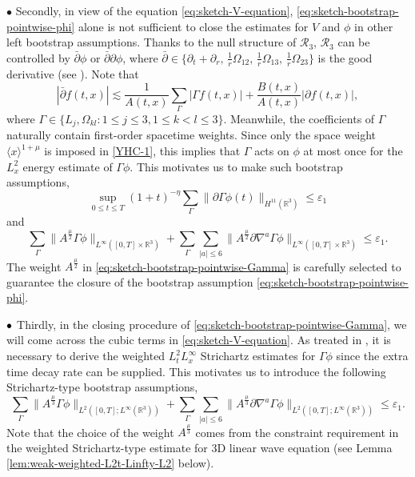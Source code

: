 \documentclass[11pt,twoside]{article}
\theoremstyle{plain}
\theoremstyle{definition}
\theoremstyle{assumption}
\numberwithin{equation}{section}
\begin{document}
 $\bullet$ Secondly, in view of the equation \eqref{eq:sketch-V-equation}, \eqref{eq:sketch-bootstrap-pointwise-phi} alone is not sufficient
 	to close the estimates for $V$ and $\phi$ in other left bootstrap
 	assumptions. Thanks to the null structure
 	of $\mathcal R_3$, $\mathcal R_3$ can be controlled by
 	$\bar\partial\phi$ or $\bar\partial\partial\phi$, where $\bar\partial\in\big\{\partial_t+\partial_r,\,
		\frac1r\Omega_{12},\,\frac1r\Omega_{13},\,	\frac1r\Omega_{23}\big\}$ is the good
 	derivative (see \cite{Alinhac:book}).
Note that
	\begin{equation}
		\label{eq:sketch-good-derivative-Gamma}
		|\bar\partial f(t,x)|
		\lesssim
		\frac1{A(t,x)}
		\sum_{\Gamma}|\Gamma f(t,x)|
		+
		\frac{B(t,x)}{A(t,x)}
		|\partial f(t,x)|,
	\end{equation}
	where $\Gamma\in\{L_j,\Omega_{kl}: 1\le j\le3, 1\le k<l\le3\}$.
	Meanwhile, the coefficients of \(\Gamma\) naturally contain first-order spacetime weights.
	Since only the space weight $\langle x\rangle^{1+\mu}$ is imposed in \eqref{YHC-1},
this implies that $\Gamma$ acts on $\phi$ at most once for the $L_x^2$ energy estimate of $\Gamma\phi$.
This motivates us  to make such bootstrap assumptions,
	\begin{equation}
		\label{eq:sketch-bootstrap-energy-Gamma}
		\sup_{0\le t\le T}
		(1+t)^{-\eta}
		\sum_{\Gamma}
		\|\partial\Gamma\phi(t)\|_{H^{11}(\mathbb R^3)}
		\le
		\varepsilon_1
	\end{equation}
	and
	\begin{equation}
		\label{eq:sketch-bootstrap-pointwise-Gamma}
		\sum_{\Gamma}
		\big\|
		A^{\frac{\mu}{2}}
		\Gamma\phi
		\big\|_{L^\infty([0,T]\times\mathbb R^3)}+
		\sum_{\Gamma}
		\sum_{|a|\le 6}
		\big\|
		A^{\frac{\mu}{2}}
		\partial\nabla^a\Gamma\phi
		\big\|_{L^\infty([0,T]\times\mathbb R^3)}
		\le
		\varepsilon_1.
	\end{equation}
	The weight $A^{\frac{\mu}{2}}$ in \eqref{eq:sketch-bootstrap-pointwise-Gamma} is carefully
	selected to guarantee the closure of the bootstrap assumption
	\eqref{eq:sketch-bootstrap-pointwise-phi}.

${\bf \bullet}$ Thirdly, in the closing procedure of
	\eqref{eq:sketch-bootstrap-pointwise-Gamma}, we will come across the cubic terms in \eqref{eq:sketch-V-equation}.
As treated in \cite{GaoLiYin2026}, it is necessary to derive the weighted \(L^2_tL^\infty_x\) Strichartz
	estimates for $\Gamma\phi$ since the extra time decay rate can be supplied.
	This motivates us to introduce the following Strichartz-type bootstrap assumptions,
	\begin{equation}\label{eq:sketch-bootstrap-Strichartz-Gamma}
		\sum_{\Gamma}
		\big\|A^{\frac{\mu}{3}}
		\Gamma\phi\big\|_{L^2([0,T];L^\infty(\mathbb R^3))}
		+\sum_{\Gamma}\sum_{|a|\le6}\big\|A^{\frac{\mu}{3}}\partial\nabla^a\Gamma\phi
		\big\|_{L^2([0,T];L^\infty(\mathbb R^3))}
		\le\varepsilon_1.
	\end{equation}
	Note that the choice of the weight $A^{\frac{\mu}{3}}$ comes from the constraint requirement in the weighted
Strichartz-type estimate for 3D linear wave equation (see Lemma \ref{lem:weak-weighted-L2t-Linfty-L2} below).
	
\end{document}
